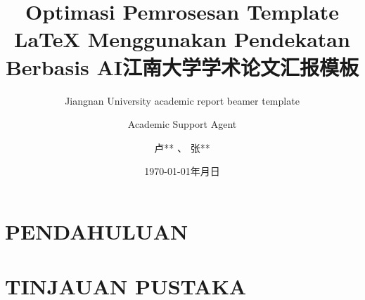 \documentclass{beamer}
\title{Optimasi Pemrosesan Template LaTeX Menggunakan Pendekatan Berbasis AI}
\author{Academic Support Agent}
\date{\today}
\begin{document}
\maketitle

\begin{abstract}

\end{abstract}

\chapter{PENDAHULUAN}


\chapter{TINJAUAN PUSTAKA}


\usepackage{hyperref}
\usepackage[CJKmath=true, AutoFakeBold = true]{xeCJK}
\usepackage[T1]{fontenc}
\usepackage{latexsym,xcolor,multicol,booktabs,calligra}
\usepackage{amssymb,amsfonts,amsmath,amsthm,mathrsfs,mathptmx} %
\usepackage{graphicx,pstricks,listings,stackengine}

\renewcommand{\today}{\number\year 年\number\month 月\number\day 日}
\renewcommand{\alert}[1]{\textbf{\color{swufe}#1}}


\author{卢** 、   张** }
\title{江南大学学术论文汇报模板}
\subtitle{Jiangnan University academic report beamer template}
\date{\today} %
\usepackage{JNU}


\def\cmd#1{\texttt{\color[RGB]{0, 0, 139}\footnotesize $\backslash$#1}}
\def\env#1{\texttt{\color[RGB]{0, 0, 139}\footnotesize #1}}



\end{document}

